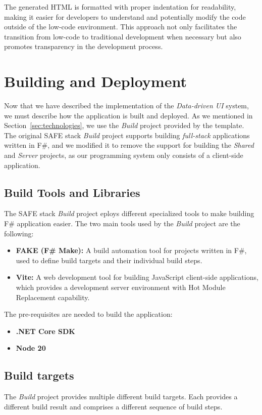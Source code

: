 The generated HTML is formatted with proper indentation for readability,
making it easier for developers to understand and potentially modify the code outside of the low-code environment.
This approach not only facilitates the transition from low-code to traditional development when necessary but also promotes transparency in the development process.

\section{Building and Deployment}
\label{sec:build}
Now that we have described the implementation of the \emph{Data-driven UI} system, we must describe how the application is built and deployed.
As we mentioned in Section~\ref{sec:technologies}, we use the \emph{Build} project provided by the \citet{safestack} template.
The original SAFE stack \emph{Build} project supports building \emph{full-stack} applications written in F\#, and we modified it to remove the support for building
the \emph{Shared} and \emph{Server} projects, as our programming system only consists of a client-side application.

\subsection{Build Tools and Libraries}
The SAFE stack \emph{Build} project eploys different specialized tools to make building F\# application easier.
The two main tools used by the \emph{Build} project are the following:
\begin{itemize}
	\item \textbf{FAKE (F\# Make):} A build automation tool for projects written in F\#, used to define build targets and their individual build steps.
	\item \textbf{Vite:} A web development tool for building JavaScript client-side applications, which provides a development server environment with Hot Module Replacement capability.
\end{itemize}


The pre-requisites are needed to build the application:
\begin{itemize}
	\item \textbf{.NET Core SDK}
	\item \textbf{Node 20}
\end{itemize}

\subsection{Build targets}
The \emph{Build} project provides multiple different build targets.
Each provides a different build result and comprises a different sequence of build steps.

